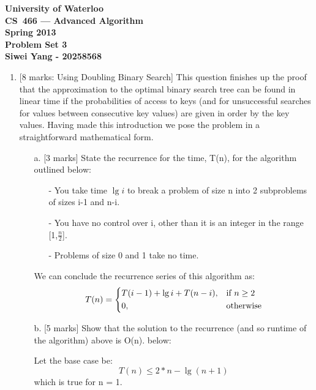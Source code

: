 \documentclass[12pt]{article}
\begin{document}
\begin{center}
\large\bf University of Waterloo\\
CS~466 --- Advanced Algorithm\\
Spring 2013\\
Problem Set 3\\
Siwei Yang - 20258568\\
\end{center}
\bigskip

\begin{enumerate}

\item{} [8 marks: Using Doubling Binary Search]
This question finishes up the proof that the approximation to the optimal binary search tree can be found in linear time if the probabilities of access to keys (and for unsuccessful searches for values between consecutive key values) are given in order by the key values. Having made this introduction we pose the problem in a straightforward mathematical form.

\begin{itemize}

\item[a.]{[3 marks]}
State the recurrence for the time, T(n), for the algorithm outlined
below:

\begin{itemize}
\item[-] You take time $\lg{i}$ to break a problem of size n into 2 subproblems of sizes i-1
and n-i.
\item[-] You have no control over i, other than it is an integer in the range [1,$\frac{n}{2}$].
\item[-] Problems of size 0 and 1 take no time.
\end{itemize}

We can conclude the recurrence series of this algorithm as:
\begin{equation}
T(n) = 
\begin{dcases}
   T(i-1) + \lg{i} + T(n-i),          & \text{if } n \geq 2\\
    0,                                        & \text{otherwise}
\end{dcases}
\end{equation}

\item[b.]{[5 marks]}
Show that the solution to the recurrence (and so runtime of the algorithm) above is O(n).
below:

Let the base case be:
\begin{equation} \label{eq:base}
T(n) \leq 2 * n - \lg{(n+1)}
\end{equation}
which is true for n = 1.


\end{itemize}
\end{enumerate}
\end{document}
